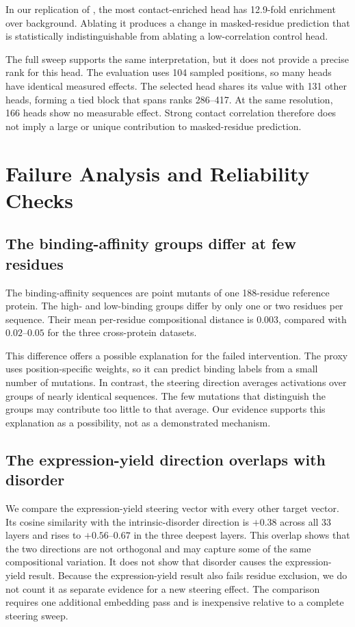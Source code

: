 \documentclass{article}
\begin{document}
In our replication of \citet{vig2021bertology}, the most
contact-enriched head has 12.9-fold enrichment over background. Ablating
it produces a change in masked-residue prediction that is statistically
indistinguishable from ablating a low-correlation control head.

The full sweep supports the same interpretation, but it does not provide
a precise rank for this head. The evaluation uses 104 sampled positions,
so many heads have identical measured effects. The selected head shares
its value with 131 other heads, forming a tied block that spans ranks
286--417. At the same resolution, 166 heads show no measurable effect.
Strong contact correlation therefore does not imply a large or unique
contribution to masked-residue prediction.

\section{Failure Analysis and Reliability Checks}
\label{sec:failure}

\subsection{The binding-affinity groups differ at few residues}

The binding-affinity sequences are point mutants of one 188-residue
reference protein. The high- and low-binding groups differ by only one
or two residues per sequence. Their mean per-residue compositional
distance is $0.003$, compared with $0.02$--$0.05$ for the three
cross-protein datasets.

This difference offers a possible explanation for the failed
intervention. The proxy uses position-specific weights, so it can predict
binding labels from a small number of mutations. In contrast, the
steering direction averages activations over groups of nearly identical
sequences. The few mutations that distinguish the groups may contribute
too little to that average. Our evidence supports this explanation as a
possibility, not as a demonstrated mechanism.

\subsection{The expression-yield direction overlaps with disorder}

We compare the expression-yield steering vector with every other target
vector. Its cosine similarity with the intrinsic-disorder direction is
$+0.38$ across all 33 layers and rises to $+0.56$--$0.67$ in the three
deepest layers. This overlap shows that the two directions are not
orthogonal and may capture some of the same compositional variation. It
does not show that disorder causes the expression-yield result. Because
the expression-yield result also fails residue exclusion, we do not count
it as separate evidence for a new steering effect. The comparison
requires one additional embedding pass and is inexpensive relative to a
complete steering sweep.
\end{document}
